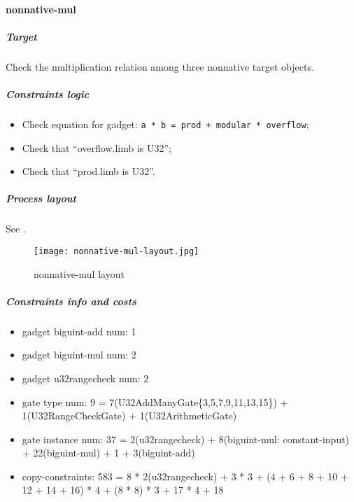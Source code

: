 \paragraph{nonnative-mul}

\subparagraph{Target}
Check the multiplication relation among three nonnative target objects.

\subparagraph{Constraints logic}
\begin{itemize}
    \item Check equation for gadget: \verb|a * b = prod + modular * overflow|;
    \item Check that ``overflow.limb is U32'';
    \item Check that ``prod.limb is U32''.
\end{itemize}

\subparagraph{Process layout}
See .
\begin{figure}[!ht]
    \centering
    \texttt{[image: nonnative-mul-layout.jpg]}
    \caption{nonnative-mul layout}
    \label{fig:nonnative-mul-layout}
\end{figure}

\subparagraph{Constraints info and costs}
\begin{itemize}
    \item gadget biguint-add num: 1
    \item gadget biguint-mul num: 2
    \item gadget u32rangecheck num: 2
    \item gate type num: 9 = 7(U32AddManyGate\{3,5,7,9,11,13,15\}) + 1(U32RangeCheckGate) + 1(U32ArithmeticGate)
    \item gate instance num: 37 = 2(u32rangecheck) + 8(biguint-mul: constant-input) + 22(biguint-mul) + 1 + 3(biguint-add)
    \item copy-constraints: 583 = 8 * 2(u32rangecheck) + 3 * 3 + (4 + 6 + 8 + 10 + 12 + 14 + 16) * 4 + (8 * 8) * 3 + 17 * 4 + 18
\end{itemize}
